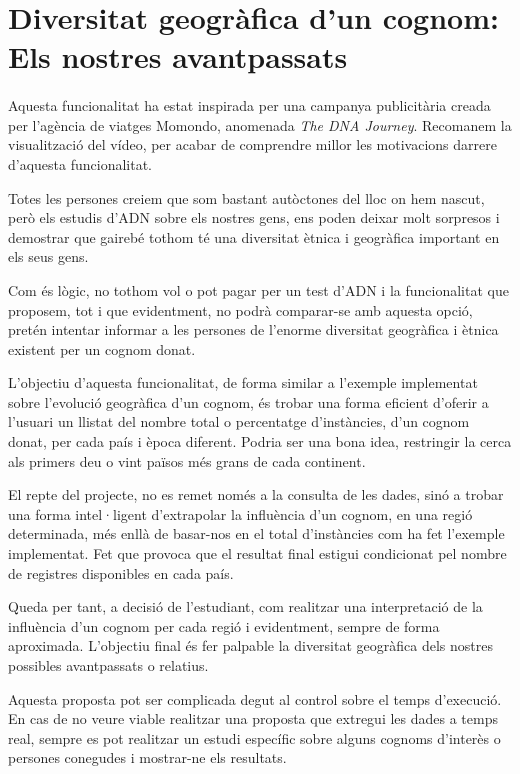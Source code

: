 \section{Diversitat geogràfica d'un cognom:\\Els nostres a\-vant\-pa\-ssats}

    \paragraph{}
    Aquesta funcionalitat ha estat inspirada per una campanya publicitària creada per l'agència de viatges Momondo, anomenada \emph{The DNA Journey}. Recomanem la visualització del vídeo, per acabar de comprendre millor les motivacions darrere d'aquesta funcionalitat.

    Totes les persones creiem que som bastant autòctones del lloc on hem nascut, però els estudis d'ADN sobre els nostres gens, ens poden deixar molt sorpresos i demostrar que gairebé tothom té una diversitat ètnica i geogràfica important en els seus gens.

    Com és lògic, no tothom vol o pot pagar per un test d'ADN i la funcionalitat que proposem, tot i que evidentment, no podrà comparar-se amb aquesta opció, pretén intentar informar a les persones de l’enorme diversitat geogràfica i ètnica existent per un cognom donat.

    L'objectiu d'aquesta funcionalitat, de forma similar a l'exemple implementat sobre l'evolució geogràfica d'un cognom, és trobar una forma eficient d'oferir a l'usuari un llistat del nombre total o percentatge d'instàncies, d'un cognom donat, per cada país i època diferent. Podria ser una bona idea, restringir la cerca als primers deu o vint països més grans de cada continent.

    El repte del projecte, no es remet només a la consulta de les dades, sinó a trobar una forma intel·ligent d'extrapolar la influència d'un cognom, en una regió determinada, més enllà de basar-nos en el total d'instàncies com ha fet l'exemple implementat. Fet que provoca que el resultat final estigui condicionat pel nombre de registres disponibles en cada país.

    Queda per tant, a decisió de l'estudiant, com realitzar una interpretació de la influència d'un cognom per cada regió i evidentment, sempre de forma aproximada. L'objectiu final és fer palpable la diversitat geogràfica dels nostres possibles avantpassats o relatius.

    Aquesta proposta pot ser complicada degut al control sobre el temps d'execució. En cas de no veure viable realitzar una proposta que extregui les dades a temps real, sempre es pot realitzar un estudi específic sobre alguns cognoms d'interès o persones conegudes i mostrar-ne els resultats.
